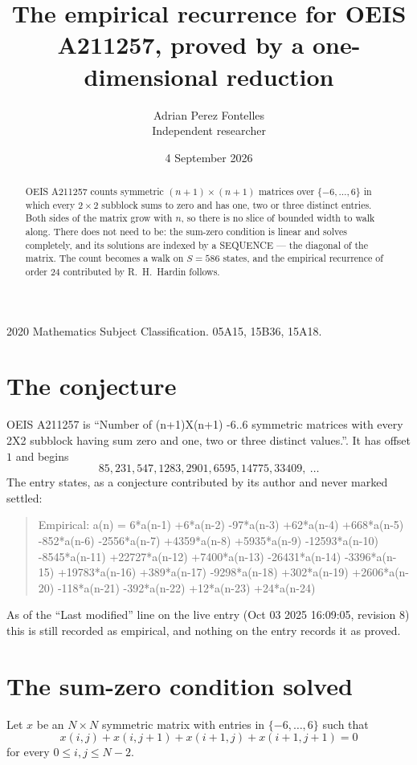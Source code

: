 \documentclass[11pt,a4paper]{article}
\title{The empirical recurrence for OEIS A211257, proved by a one-dimensional reduction}
\author{Adrian Perez Fontelles\\ \small Independent researcher}
\date{4 September 2026}
\theoremstyle{plain}
\theoremstyle{definition}
\begin{document}
\maketitle

\begin{abstract}
OEIS A211257 counts symmetric $(n+1)\times(n+1)$ matrices over
$\{-6,\dots,6\}$ in which every $2\times2$ subblock sums to zero and has one, two or three distinct
entries. Both sides of the matrix grow with $n$, so there is no slice of bounded width to walk
along. There does not need to be: the sum-zero condition is linear and solves completely, and
its solutions are indexed by a SEQUENCE --- the diagonal of the matrix. The count becomes a walk
on $S=586$ states, and the empirical recurrence of order $24$ contributed by R.~H.~Hardin
follows.
\end{abstract}

\noindent\small 2020 Mathematics Subject Classification. 05A15, 15B36, 15A18.\normalsize

\section{The conjecture}

OEIS A211257 is ``Number of (n+1)X(n+1) -6..6 symmetric matrices with every 2X2 subblock having sum zero and one, two or three distinct values.''. It has offset $1$ and begins
\[
85, 231, 547, 1283, 2901, 6595, 14775, 33409,\ \dots
\]
The entry states, as a conjecture contributed by its author and never marked settled:
\begin{quote}
Empirical: a(n) = 6*a(n-1) +6*a(n-2) -97*a(n-3) +62*a(n-4) +668*a(n-5) -852*a(n-6) -2556*a(n-7) +4359*a(n-8) +5935*a(n-9) -12593*a(n-10) -8545*a(n-11) +22727*a(n-12) +7400*a(n-13) -26431*a(n-14) -3396*a(n-15) +19783*a(n-16) +389*a(n-17) -9298*a(n-18) +302*a(n-19) +2606*a(n-20) -118*a(n-21) -392*a(n-22) +12*a(n-23) +24*a(n-24)
\end{quote}
As of the ``Last modified'' line on the live entry (Oct 03 2025 16:09:05, revision 8) this is still
recorded as empirical, and nothing on the entry records it as proved.

\section{The sum-zero condition solved}

Let $x$ be an $N\times N$ symmetric matrix with entries in $\{-6,\dots,6\}$ such that
\[
x(i,j)+x(i,j{+}1)+x(i{+}1,j)+x(i{+}1,j{+}1)=0
\]
for every $0\le i,j\le N-2$.
\end{document}
